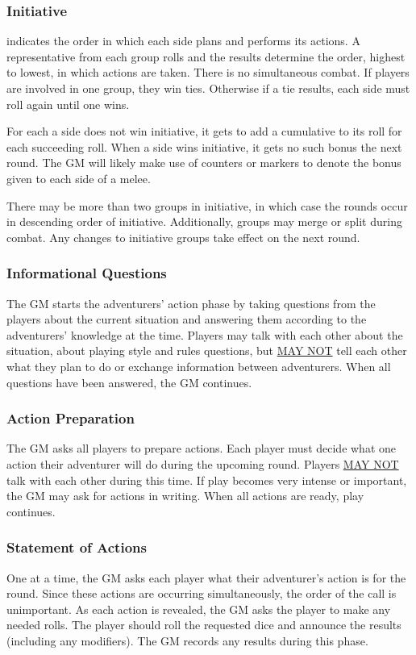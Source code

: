 \begin{multicols}{2}
\subsubsection{Initiative}
 indicates the order in which each side plans and performs its actions. A representative from each group rolls  and the results determine the order, highest to lowest, in which actions are taken. There is no simultaneous combat. If players are involved in one group, they win ties. Otherwise if a tie results, each side must roll again until one wins.

For each  a side does not win initiative, it gets to add a cumulative  to its roll for each succeeding roll. When a side wins initiative, it gets no such bonus the next round. The GM will likely make use of counters or markers to denote the bonus given to each side of a melee.

There may be more than two groups in initiative, in which case the rounds occur in descending order of initiative. Additionally, groups may merge or split during combat.  Any changes to initiative groups take effect on the next round. 
\subsubsection{Informational Questions}
The GM starts the adventurers' action phase by taking questions from the players about the current situation and answering them according to the adventurers' knowledge at the time. Players may talk with each other about the situation, about playing style and rules questions, but \uline{MAY NOT} tell each other what they plan to do or exchange information between adventurers. When all questions have been answered, the GM continues.
\subsubsection{Action Preparation}
The GM asks all players to prepare actions. Each player must decide what one action their adventurer will do during the upcoming round. Players \uline{MAY NOT} talk with each other during this time. If play becomes very intense or important, the GM may ask for actions in writing. When all actions are ready, play continues.
\subsubsection{Statement of Actions}
One at a time, the GM asks each player what their adventurer's action is for the round. Since these actions are occurring simultaneously, the order of the call is unimportant. As each action is revealed, the GM asks the player to make any needed rolls. The player should roll the requested dice and announce the results (including any modifiers). The GM records any results during this phase.

\end{multicols}
